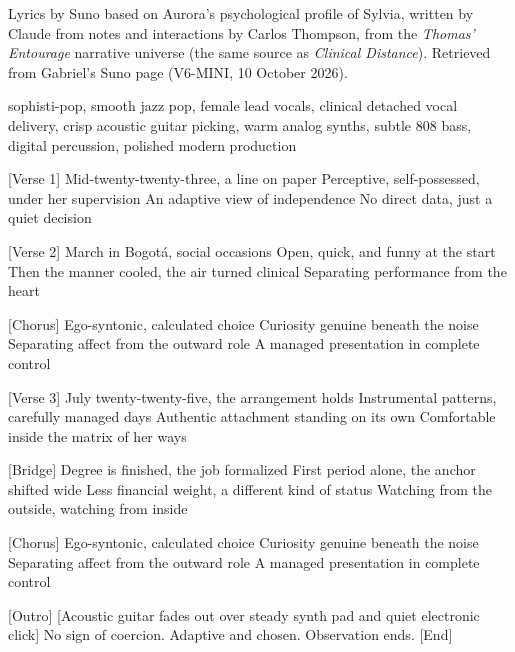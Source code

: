 \begin{notes}
Lyrics by Suno based on Aurora's psychological profile of Sylvia, written by Claude from notes and interactions by Carlos Thompson, from the \emph{Thomas' Entourage} narrative universe (the same source as \emph{Clinical Distance}). Retrieved from Gabriel's Suno page (V6-MINI, 10 October 2026).
\end{notes}
\begin{style}
sophisti-pop, smooth jazz pop, female lead vocals, clinical detached vocal delivery, crisp acoustic guitar picking, warm analog synths, subtle 808 bass, digital percussion, polished modern production
\end{style}
\begin{lyrics}

[Verse 1]
Mid-twenty-twenty-three, a line on paper
Perceptive, self-possessed, under her supervision
An adaptive view of independence
No direct data, just a quiet decision

[Verse 2]
March in Bogotá, social occasions
Open, quick, and funny at the start
Then the manner cooled, the air turned clinical
Separating performance from the heart

[Chorus]
Ego-syntonic, calculated choice
Curiosity genuine beneath the noise
Separating affect from the outward role
A managed presentation in complete control

[Verse 3]
July twenty-twenty-five, the arrangement holds
Instrumental patterns, carefully managed days
Authentic attachment standing on its own
Comfortable inside the matrix of her ways

[Bridge]
Degree is finished, the job formalized
First period alone, the anchor shifted wide
Less financial weight, a different kind of status
Watching from the outside, watching from inside

[Chorus]
Ego-syntonic, calculated choice
Curiosity genuine beneath the noise
Separating affect from the outward role
A managed presentation in complete control

[Outro]
[Acoustic guitar fades out over steady synth pad and quiet electronic click]
No sign of coercion.
Adaptive and chosen.
Observation ends.
[End]
\end{lyrics}

